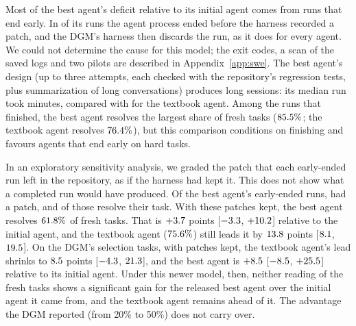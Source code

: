 Most of the best agent's deficit relative to its initial agent comes from runs that end early. In \vsweBestEarly{} of
its \vsweBestRuns{} runs the agent process ended before the harness recorded a patch, and the DGM's harness then discards the
run, as it does for every agent. We could not determine the cause for this model; the exit codes, a scan of the saved
logs and two pilots are described in Appendix~\ref{app:swe}. The best agent's design (up to three attempts, each checked
with the repository's regression tests, plus summarization of long conversations) produces long sessions: its median
run took \vsweBestMedMin{} minutes, compared with \vsweMovesMedMin{} for the textbook agent. Among the runs that finished, the best
agent resolves the largest share of fresh tasks ($85.5\%$; the textbook
agent resolves $76.4\%$), but this comparison conditions on finishing and favours agents that end early on hard tasks.

In an exploratory sensitivity analysis, we graded the patch that each early-ended run left in the repository, as if
the harness had kept it. This does not show what a completed run would have produced. Of the best agent's
\vsweBestEarly{} early-ended runs, \vsensBestPatched{} had a patch, and \vsensBestPatchedResolved{} of those resolve their
task. With these patches kept, the best agent resolves $61.8\%$ of fresh tasks. That is $+3.7$
points [$-3.3$, $+10.2$] relative to the initial agent, and the textbook agent
($75.6\%$) still leads it by $13.8$ points [$8.1$,
$19.5$]. On the DGM's selection tasks, with patches kept, the textbook agent's lead shrinks to
$8.5$ points [$-4.3$, $21.3$], and the best agent
is $+8.5$ [$-8.5$, $+25.5$] relative to its initial agent. Under
this newer model, then, neither reading of the fresh tasks shows a significant gain for the released best agent over
the initial agent it came from, and the textbook agent remains ahead of it. The advantage the DGM reported (from 20\% to 50\%) does not carry over.



